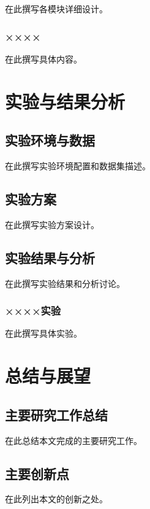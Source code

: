 \documentclass[12pt, a4paper, openany]{ctexbook}
\begin{document}
在此撰写各模块详细设计。

\subsection{××××}

在此撰写具体内容。

\chapter{实验与结果分析}

\section{实验环境与数据}

在此撰写实验环境配置和数据集描述。

\section{实验方案}

在此撰写实验方案设计。

\section{实验结果与分析}

在此撰写实验结果和分析讨论。

\subsection{××××实验}

在此撰写具体实验。

\chapter{总结与展望}

\section{主要研究工作总结}

在此总结本文完成的主要研究工作。

\section{主要创新点}

在此列出本文的创新之处。
\end{document}
